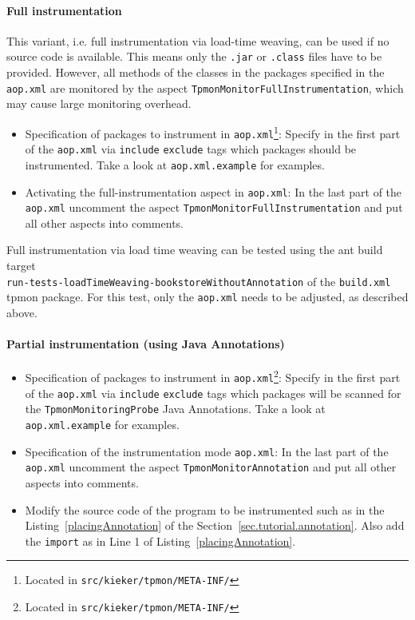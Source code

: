 \documentclass[a4paper,12pt]{scrartcl}
\begin{document}
\paragraph{Full instrumentation}
This variant, i.e. full instrumentation via load-time weaving, can be used if no source code is available. This means only the \texttt{.jar} or \texttt{.class} files have to be provided. However, all methods of the classes in the packages specified in the \texttt{aop.xml} are monitored by the aspect \texttt{TpmonMonitorFullInstrumentation}, which may cause large monitoring overhead.

\begin{itemize}
 \item Specification of packages to instrument in \texttt{aop.xml}\footnote{Located in \texttt{src/kieker/tpmon/META-INF/}}: Specify in the first part of the \texttt{aop.xml} via \texttt{include} \texttt{exclude} tags which packages should be instrumented. Take a look at  \texttt{aop.xml.example} for examples.
\item Activating the full-instrumentation aspect in \texttt{aop.xml}: In the last part of the \texttt{aop.xml} uncomment the aspect \texttt{TpmonMonitorFullInstrumentation} and put all other aspects into comments.
\end{itemize}

Full instrumentation via load time weaving can be tested using the ant build target \\ \small \texttt{run-tests-loadTimeWeaving-bookstoreWithoutAnnotation} \normalsize of the \texttt{build.xml} tpmon package. For this test, only the \texttt{aop.xml} needs to be adjusted, as described above.

\paragraph{Partial instrumentation (using Java Annotations)}
\begin{itemize}
 \item Specification of packages to instrument in \texttt{aop.xml}\footnote{Located in \texttt{src/kieker/tpmon/META-INF/}}: Specify in the first part of the \texttt{aop.xml} via \texttt{include} \texttt{exclude} tags which packages will be scanned for the \texttt{TpmonMonitoringProbe} Java Annotations. Take a look at  \texttt{aop.xml.example} for examples.
\item Specification of the instrumentation mode \texttt{aop.xml}: In the last part of the \texttt{aop.xml} uncomment the aspect \texttt{TpmonMonitorAnnotation} and put all other aspects into comments.
\item Modify the source code of the program to be instrumented such as in the Listing~\ref{placingAnnotation} of the Section~\ref{sec.tutorial.annotation}. Also add the \texttt{import} as in Line 1 of Listing~\ref{placingAnnotation}.
\end{itemize}
\end{document}
